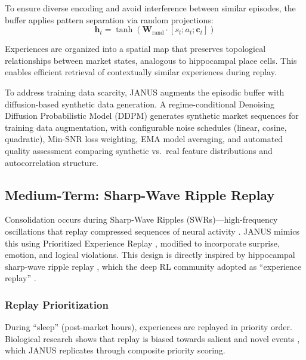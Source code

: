 \documentclass[12pt, a4paper]{article}
\begin{document}
To ensure diverse encoding and avoid interference between similar episodes, the buffer applies pattern separation via random projections:
\begin{equation}
	\mathbf{h}_t = \tanh(\mathbf{W}_{\text{rand}} \cdot [s_t; a_t; \mathbf{c}_t])
\end{equation}

Experiences are organized into a spatial map that preserves topological relationships between market states, analogous to hippocampal place cells. This enables efficient retrieval of contextually similar experiences during replay.

To address training data scarcity, JANUS augments the episodic buffer with diffusion-based synthetic data generation. A regime-conditional Denoising Diffusion Probabilistic Model (DDPM) \citep{coletta2024conditional} generates synthetic market sequences for training data augmentation, with configurable noise schedules (linear, cosine, quadratic), Min-SNR loss weighting, EMA model averaging, and automated quality assessment comparing synthetic vs.\ real feature distributions and autocorrelation structure.

\subsection{Medium-Term: Sharp-Wave Ripple Replay}
\label{sec:swr}

Consolidation occurs during Sharp-Wave Ripples (SWRs)---high-frequency oscillations that replay compressed sequences of neural activity \citep{buzsaki2015hippocampal}. JANUS mimics this using Prioritized Experience Replay \citep{schaul2015prioritized}, modified to incorporate surprise, emotion, and logical violations. This design is directly inspired by hippocampal sharp-wave ripple replay \citep{wilson1994replay, buzsaki2015hippocampal, buzsaki1989twostage}, which the deep RL community adopted as ``experience replay'' \citep{mnih2015human, schaul2015prioritized}.

\subsubsection{Replay Prioritization}

During ``sleep'' (post-market hours), experiences are replayed in priority order. Biological research shows that replay is biased towards salient and novel events \citep{kar2023selection, mattar2018prioritized}, which JANUS replicates through composite priority scoring.
\end{document}
